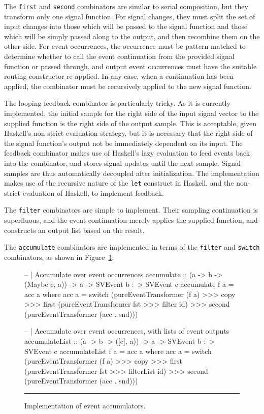 The {\tt first} and {\tt second} combinators are similar to serial composition,
but they transform only one signal function. For signal changes, they must split
the set of input changes into those which will be passed to the signal function
and those which will be simply passed along to the output, and then recombine
them on the other side. For event occurrences, the occurrence must be
pattern-matched to determine whether to call the event continuation from the
provided signal function or passed through, and output event occurrences must
have the suitable routing constructor re-applied. In any case, when a
continuation has been applied, the combinator must be recursively applied to the
new signal function.

The looping feedback combinator is particularly tricky. As it is currently
implemented, the initial sample for the right side of the input signal vector to
the supplied function is the right side of the output sample. This is acceptable,
given Haskell's non-strict evaluation strategy, but it is necessary that the
right side of the signal function's output not be immediately dependent on its
input. The feedback combinator makes use of Haskell's lazy evaluation to
feed events back into the combinator, and stores signal updates until the next
sample. Signal samples are thus automatically decoupled after initialization.
The implementation makes use of the recursive nature of the {\tt let} construct
in Haskell, and the non-strict evaluation of Haskell, to implement feedback.


The {\tt filter} combinators are simple to implement. Their sampling
continuation is superfluous, and the event continuation merely applies the
supplied function, and constructs an output list based on the result.

The {\tt accumulate} combinators are implemented in terms of the {\tt filter}
and {\tt switch} combinators, as shown in
Figure~\ref{figure:accumulate_implementation}.

\begin{figure}
\begin{code}
-- | Accumulate over event occurrences
accumulate :: (a -> b -> (Maybe c, a)) -> a -> SVEvent b :~> SVEvent c
accumulate f a = acc a
  where acc a = switch (pureEventTransformer (f a) >>>
                        copy >>>
                        first (pureEventTransformer fst >>> filter id) >>>
                        second (pureEventTransformer (acc . snd)))

-- | Accumulate over event occurrences, with lists of event outputs
accumulateList :: (a -> b -> ([c], a)) -> a -> SVEvent b :~> SVEvent c
accumulateList f a = acc a
  where acc a = switch (pureEventTransformer (f a) >>>
                        copy >>>
                        first (pureEventTransformer fst >>> filterList id) >>>
                        second (pureEventTransformer (acc . snd)))
\end{code}
\hrule
\caption{Implementation of event accumulators.}
\label{figure:accumulate_implementation}
\end{figure}

